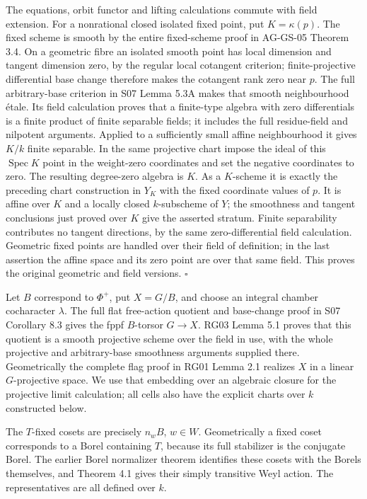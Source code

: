 \documentclass[11pt,a4paper,openany]{report}
\begin{document}
The equations, orbit functor and lifting calculations commute with field extension. For a nonrational closed isolated fixed point, put \(K=\kappa(p)\). The fixed scheme is smooth by the entire fixed-scheme proof in AG-GS-05 Theorem 3.4. On a geometric fibre an isolated smooth point has local dimension and tangent dimension zero, by the regular local cotangent criterion; finite-projective differential base change therefore makes the cotangent rank zero near \(p\). The full arbitrary-base criterion in S07 Lemma 5.3A makes that smooth neighbourhood étale. Its field calculation proves that a finite-type algebra with zero differentials is a finite product of finite separable fields; it includes the full residue-field and nilpotent arguments. Applied to a sufficiently small affine neighbourhood it gives \(K/k\) finite separable. In the same projective chart impose the ideal of this \(\operatorname{Spec}K\) point in the weight-zero coordinates and set the negative coordinates to zero. The resulting degree-zero algebra is \(K\). As a \(K\)-scheme it is exactly the preceding chart construction in \(Y_K\) with the fixed coordinate values of \(p\). It is affine over \(K\) and a locally closed \(k\)-subscheme of \(Y\); the smoothness and tangent conclusions just proved over \(K\) give the asserted stratum. Finite separability contributes no tangent directions, by the same zero-differential field calculation. Geometric fixed points are handled over their field of definition; in the last assertion the affine space and its zero point are over that same field. This proves the original geometric and field versions. \(\square\)

Let \(B\) correspond to \(\Phi^+\), put \(X=G/B\), and choose an integral chamber cocharacter \(\lambda\). The full flat free-action quotient and base-change proof in S07 Corollary 8.3 gives the fppf \(B\)-torsor \(G\to X\). RG03 Lemma 5.1 proves that this quotient is a smooth projective scheme over the field in use, with the whole projective and arbitrary-base smoothness arguments supplied there. Geometrically the complete flag proof in RG01 Lemma 2.1 realizes \(X\) in a linear \(G\)-projective space. We use that embedding over an algebraic closure for the projective limit calculation; all cells also have the explicit charts over \(k\) constructed below.

The \(T\)-fixed cosets are precisely \(n_wB\), \(w\in W\). Geometrically a fixed coset corresponds to a Borel containing \(T\), because its full stabilizer is the conjugate Borel. The earlier Borel normalizer theorem identifies these cosets with the Borels themselves, and Theorem 4.1 gives their simply transitive Weyl action. The representatives are all defined over \(k\).
\end{document}
